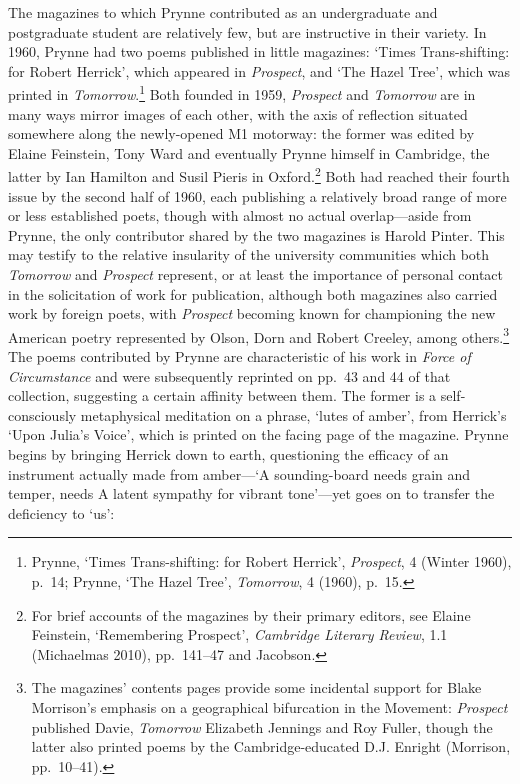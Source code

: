 \documentclass[]{article}
\begin{document}
The magazines to which Prynne contributed as an undergraduate and
postgraduate student are relatively few, but are instructive in their
variety. In 1960, Prynne had two poems published in little magazines:
‘Times Trans-shifting: for Robert Herrick’, which appeared in
\emph{Prospect}, and ‘The Hazel Tree’, which was printed in
\emph{Tomorrow}.\footnote{Prynne, ‘Times Trans-shifting: for Robert
  Herrick’, \emph{Prospect}, 4 (Winter 1960), p.~14; Prynne, ‘The Hazel
  Tree’, \emph{Tomorrow}, 4 (1960), p.~15.} Both founded in 1959,
\emph{Prospect} and \emph{Tomorrow} are in many ways mirror images of
each other, with the axis of reflection situated somewhere along the
newly-opened M1 motorway: the former was edited by Elaine Feinstein,
Tony Ward and eventually Prynne himself in Cambridge, the latter by Ian
Hamilton and Susil Pieris in Oxford.\footnote{For brief accounts of the
  magazines by their primary editors, see Elaine Feinstein, ‘Remembering
  Prospect’, \emph{Cambridge Literary Review}, 1.1 (Michaelmas 2010),
  pp.~141–47 and Jacobson.} Both had reached their fourth issue by the
second half of 1960, each publishing a relatively broad range of more or
less established poets, though with almost no actual overlap—aside from
Prynne, the only contributor shared by the two magazines is Harold
Pinter. This may testify to the relative insularity of the university
communities which both \emph{Tomorrow} and \emph{Prospect} represent, or
at least the importance of personal contact in the solicitation of work
for publication, although both magazines also carried work by foreign
poets, with \emph{Prospect} becoming known for championing the new
American poetry represented by Olson, Dorn and Robert Creeley, among
others.\footnote{The magazines’ contents pages provide some incidental
  support for Blake Morrison’s emphasis on a geographical bifurcation in
  the Movement: \emph{Prospect} published Davie, \emph{Tomorrow}
  Elizabeth Jennings and Roy Fuller, though the latter also printed
  poems by the Cambridge-educated D.J. Enright (Morrison, pp.~10–41).}
The poems contributed by Prynne are characteristic of his work in
\emph{Force of Circumstance} and were subsequently reprinted on pp.~43
and 44 of that collection, suggesting a certain affinity between them.
The former is a self-consciously metaphysical meditation on a phrase,
‘lutes of amber’, from Herrick’s ‘Upon Julia’s Voice’, which is printed
on the facing page of the magazine. Prynne begins by bringing Herrick
down to earth, questioning the efficacy of an instrument actually made
from amber—‘A sounding-board needs grain and temper, needs \textbar{} A
latent sympathy for vibrant tone’—yet goes on to transfer the deficiency
to ‘us’:
\end{document}
